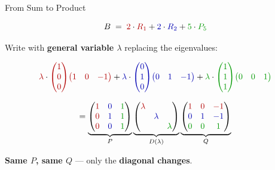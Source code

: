 \documentclass[10pt]{beamer}
\theoremstyle{definition}
\newcommand{\x}[1]{\alert{\textbf{#1}}}
\newcommand{\rd}[1]{{\color{red!70!black}#1}}
\newcommand{\bl}[1]{{\color{blue!70!black}#1}}
\newcommand{\gn}[1]{{\color{green!60!black}#1}}
\begin{document}
\begin{frame}[shrink=15]{From Sum to Product}

$$B \;=\; \rd{2}\cdot\rd{R_1} + \bl{2}\cdot\bl{R_2} + \gn{5}\cdot\gn{P_5}$$

\vfill

Write with \x{general variable $\lambda$} replacing the eigenvalues:

$$\rd{\lambda}\cdot\rd{\begin{pmatrix}1\\0\\0\end{pmatrix}}\rd{\begin{pmatrix}1&0&-1\end{pmatrix}} + \bl{\lambda}\cdot\bl{\begin{pmatrix}0\\1\\0\end{pmatrix}}\bl{\begin{pmatrix}0&1&-1\end{pmatrix}} + \gn{\lambda}\cdot\gn{\begin{pmatrix}1\\1\\1\end{pmatrix}}\gn{\begin{pmatrix}0&0&1\end{pmatrix}}$$

\vfill

$$= \underbrace{\begin{pmatrix}\rd{1}&\bl{0}&\gn{1}\\\rd{0}&\bl{1}&\gn{1}\\\rd{0}&\bl{0}&\gn{1}\end{pmatrix}}_{P} \underbrace{\begin{pmatrix}\rd{\lambda}&&\\&\bl{\lambda}&\\&&\gn{\lambda}\end{pmatrix}}_{D(\lambda)} \underbrace{\begin{pmatrix}\rd{1}&\rd{0}&\rd{-1}\\\bl{0}&\bl{1}&\bl{-1}\\\gn{0}&\gn{0}&\gn{1}\end{pmatrix}}_{Q}$$

\vfill

\x{Same $P$, same $Q$} --- only the \x{diagonal changes}.

\end{frame}
\end{document}
